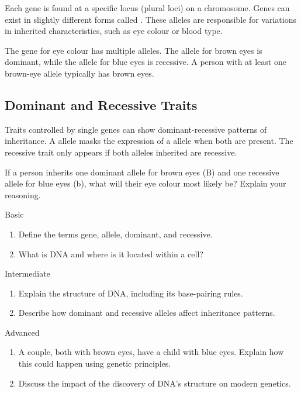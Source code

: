Each gene is found at a specific locus (plural loci) on a chromosome. Genes can exist in slightly different forms called . These alleles are responsible for variations in inherited characteristics, such as eye colour or blood type.

\begin{example}
The gene for eye colour has multiple alleles. The allele for brown eyes is dominant, while the allele for blue eyes is recessive. A person with at least one brown-eye allele typically has brown eyes.
\end{example}

\subsection{Dominant and Recessive Traits}

Traits controlled by single genes can show dominant-recessive patterns of inheritance. A  allele masks the expression of a  allele when both are present. The recessive trait only appears if both alleles inherited are recessive.

\begin{stopandthink}
If a person inherits one dominant allele for brown eyes (B) and one recessive allele for blue eyes (b), what will their eye colour most likely be? Explain your reasoning.
\end{stopandthink}

\begin{tieredquestions}{Basic}
\begin{enumerate}
    \item Define the terms gene, allele, dominant, and recessive.
    \item What is DNA and where is it located within a cell?
\end{enumerate}
\end{tieredquestions}

\begin{tieredquestions}{Intermediate}
\begin{enumerate}
    \item Explain the structure of DNA, including its base-pairing rules.
    \item Describe how dominant and recessive alleles affect inheritance patterns.
\end{enumerate}
\end{tieredquestions}

\begin{tieredquestions}{Advanced}
\begin{enumerate}
    \item A couple, both with brown eyes, have a child with blue eyes. Explain how this could happen using genetic principles.
    \item Discuss the impact of the discovery of DNA’s structure on modern genetics.
\end{enumerate}
\end{tieredquestions}

